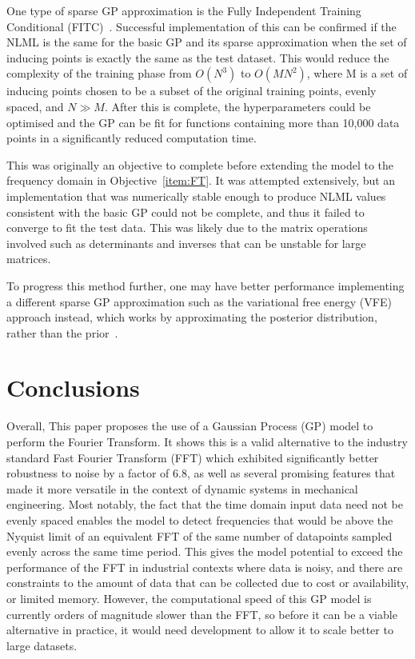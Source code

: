 \documentclass[12pt]{article}
\begin{document}
    One type of sparse GP approximation is the Fully Independent Training Conditional (FITC)~\cite{q-candela}.
    Successful implementation of this can be confirmed if the NLML is the same for the basic GP and its sparse approximation when the set of inducing points is exactly the same as the test dataset.
    This would reduce the complexity of the training phase from $O(N^3)$ to $O(MN^2)$, where M is a set of inducing points chosen to be a subset of the original training points, evenly spaced, and $N \gg M$. 
    After this is complete, the hyperparameters could be optimised and the GP can be fit for functions containing more than 10,000 data points in a significantly reduced computation time.

     This was originally an objective to complete before extending the model to the frequency domain in Objective~\ref{item:FT}.
    It was attempted extensively, but an implementation that was numerically stable enough to produce NLML values consistent with the basic GP could not be complete, and thus it failed to converge to fit the test data.
    This was likely due to the matrix operations involved such as determinants and inverses that can be unstable for large matrices.

    To progress this method further, one may have better performance implementing a different sparse GP approximation such as the variational free energy (VFE) approach instead, which works by approximating the posterior distribution, rather than the prior~\cite{murphy2023probabilistic}.


    \section{Conclusions}
    Overall, This paper proposes the use of a Gaussian Process (GP) model to perform the Fourier Transform.
    It shows this is a valid alternative to the industry standard Fast Fourier Transform (FFT) which exhibited significantly better robustness to noise by a factor of 6.8, as well as several promising features that made it more versatile in the context of dynamic systems in mechanical engineering.
    Most notably, the fact that the time domain input data need not be evenly spaced enables the model to detect frequencies that would be above the Nyquist limit of an equivalent FFT of the same number of datapoints sampled evenly across the same time period.
    This gives the model potential to exceed the performance of the FFT in industrial contexts where data is noisy, and there are constraints to the amount of data that can be collected due to cost or availability, or limited memory.
    However, the computational speed of this GP model is currently orders of magnitude slower than the FFT, so before it can be a viable alternative in practice, it would need development to allow it to scale better to large datasets.

    \FloatBarrier

    \newpage
    \printbibliography
    \newpage
    
\end{document}

